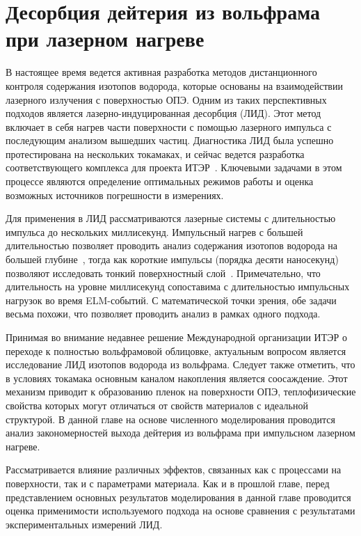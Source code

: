\chapter{Десорбция дейтерия из вольфрама при лазерном нагреве}\label{ch:ch4}

В настоящее время ведется активная разработка методов дистанционного контроля содержания изотопов водорода, которые основаны на взаимодействии лазерного излучения с поверхностью ОПЭ. Одним из таких перспективных подходов является лазерно-индуцированная десорбция (ЛИД). Этот метод включает в себя нагрев части поверхности с помощью лазерного импульса с последующим анализом вышедших частиц. Диагностика ЛИД была успешно протестирована на нескольких токамаках, и сейчас ведется разработка соответствующего комплекса для проекта ИТЭР~\cite{Zlobinski2024}. Ключевыми задачами в этом процессе являются определение оптимальных режимов работы и оценка возможных источников погрешности в измерениях.

Для применения в ЛИД рассматриваются лазерные системы с длительностью импульса до нескольких миллисекунд. Импульсный нагрев с большей длительностью позволяет проводить анализ содержания изотопов водорода на большей глубине~\cite{Yu2019, Zlobinski2020}, тогда как короткие импульсы (порядка десяти наносекунд) позволяют исследовать тонкий поверхностный слой~\cite{Gasparyan2021}. Примечательно, что длительность на уровне миллисекунд сопоставима с длительностью импульсных нагрузок во время ELM-событий. С математической точки зрения, обе задачи весьма похожи, что позволяет проводить анализ в рамках одного подхода.

Принимая во внимание недавнее решение Международной организации ИТЭР о переходе к полностью вольфрамовой облицовке, актуальным вопросом является исследование ЛИД изотопов водорода из вольфрама. Следует также отметить, что в условиях токамака основным каналом накопления является соосаждение. Этот механизм приводит к образованию пленок на поверхности ОПЭ, теплофизические свойства которых могут отличаться от свойств материалов с идеальной структурой. В данной главе на основе численного моделирования проводится анализ закономерностей выхода дейтерия из вольфрама при импульсном лазерном нагреве.

Рассматривается влияние различных эффектов, связанных как с процессами на поверхности, так и с параметрами материала. Как и в прошлой главе, перед представлением основных результатов моделирования в данной главе проводится оценка применимости используемого подхода на основе сравнения с результатами экспериментальных измерений ЛИД.

